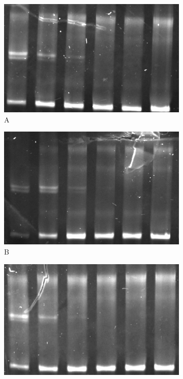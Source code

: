 \documentclass[parskip=full, numbers=noenddot]{scrreprt}
\begin{document}
\begin{figure}[htpb]
  \centering
  \begin{subfigure}[htpb]{0.4\textwidth}
    \centering
    \includegraphics[width=\textwidth]{reconstnuc_a}
    \caption{A}
    \label{fig:reconstnuc_a}
  \end{subfigure}
  \begin{subfigure}[htpb]{0.4\textwidth}
    \centering
    \includegraphics[width=\textwidth]{reconstnuc_b}
    \caption{B}
    \label{fig:reconstnuc_b}
  \end{subfigure}
  \begin{subfigure}[htpb]{0.4\textwidth}
    \centering
    \includegraphics[width=\textwidth]{reconstnuc_c}

\end{subfigure}
\end{figure}
\end{document}
